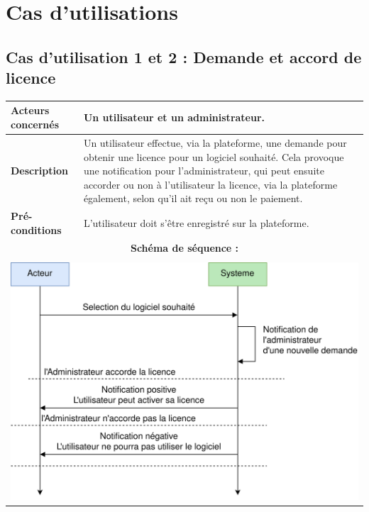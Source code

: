 \section{Cas d'utilisations}

\subsection{Cas d'utilisation 1 et 2 : Demande et accord de licence}

\begin{table}[!h]
	\centering
	\begin{tabular}{| m{4cm} | m{12cm} |}
		\hline
		    \textbf{Acteurs concernés} & Un utilisateur et un administrateur. \\
		\hline
		    \textbf{Description} & Un utilisateur effectue, via la plateforme, une demande pour obtenir une licence pour un logiciel souhaité. Cela provoque une notification pour l'administrateur, qui peut ensuite accorder ou non à l'utilisateur la licence, via la plateforme également, selon qu'il ait reçu ou non le paiement. \\
		\hline
		    \textbf{Pré-conditions} & L'utilisateur doit s'être enregistré sur la plateforme.\\
		\hline
		    \multicolumn{2}{|c|}{\textbf{Schéma de séquence :}} \\
		\hline
		    \multicolumn{2}{|c|}{}\\
		    \multicolumn{2}{|c|}{\includegraphics[width=15cm]{main/png/seq_demande.png}} \\
		\hline
	\end{tabular}
	\label{tab:tab2}
\end{table}
\newpage

